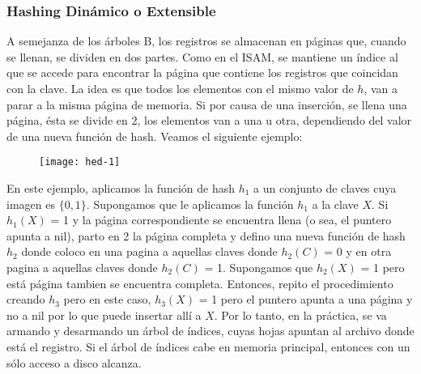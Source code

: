 \documentclass[10pt,a4paper]{article}
\begin{document}
\subsubsection{Hashing Dinámico o Extensible}

A semejanza de los árboles B, los registros se almacenan en páginas que, cuando se llenan, se dividen en dos partes.
\newline
\newline
Como en el ISAM, se mantiene un índice al que se accede para encontrar la página que contiene los registros que coincidan con la clave.
\newline
\newline
La idea es que todos los elementos con el mismo valor de $h$, van a parar a la misma página de memoria.
\newline
\newline
Si por causa de una inserción, se llena una página, ésta se divide en 2, los elementos van a una u otra, dependiendo del valor de una nueva función de hash.
\newline
\newline
Veamos el siguiente ejemplo:
\newline
\newline
\begin{figure}[h]
	\centering
\texttt{[image: hed-1]}
	\label{drivers1}
\end{figure}      
\newline
\newline
En este ejemplo, aplicamos la función de hash $h_{1}$ a un conjunto de claves cuya imagen es $\{0,1\}$. Supongamos que le aplicamos la función $h_{1}$ a la clave $X$. Si $h_{1}(X)$ = 1 y la página correspondiente se encuentra llena (o sea, el puntero apunta a nil), parto en 2 la página completa y defino una nueva función de hash $h_{2}$ donde coloco en una pagina a aquellas claves donde $h_{2}(C)$ = 0 y en otra pagina a aquellas claves donde $h_{2}(C)$ = 1. Supongamos que $h_{2}(X)$ = 1 pero está página tambien se encuentra completa. Entonces, repito el procedimiento creando $h_{3}$ pero en este caso, $h_{3}(X)$ = 1 pero el puntero apunta a una página y no a nil por lo que puede insertar allí a $X$.    
\newline
\newline
Por lo tanto, en la práctica, se va armando y desarmando un árbol de índices, cuyas hojas apuntan al archivo donde está el registro. Si el árbol de índices cabe en memoria principal, entonces con un sólo acceso a disco alcanza.
\newpage
\end{document}
